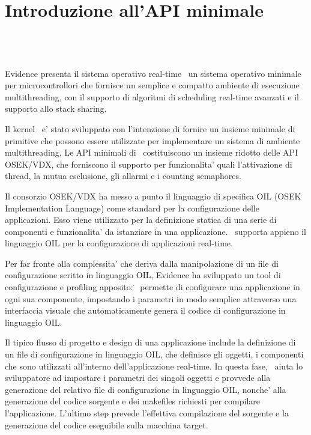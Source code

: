 \chapter{Introduzione all'API minimale}

\section{\ee\ }

Evidence presenta il sistema operativo real-time \ee\, un sistema operativo
minimale per microcontrollori che fornisce un semplice e compatto ambiente
di esecuzione multithreading, con il supporto di algoritmi di scheduling
real-time avanzati e il supporto allo stack sharing.

Il kernel \ee\ e' stato sviluppato con l'intenzione di fornire un insieme
minimale di primitive che possono essere utilizzate per implementare
un sistema di ambiente multithreading. Le API minimali di \ee\ costituiscono un
insieme ridotto delle API OSEK/VDX, che forniscono il supporto per
funzionalita' quali l'attivazione di thread, la mutua esclusione, gli
allarmi e i counting semaphores.

Il consorzio OSEK/VDX ha messo a punto il linguaggio di specifica OIL 
(OSEK Implementation Language) come standard per la configurazione delle
applicazioni. Esso viene utilizzato per la definizione statica di una 
serie di componenti e funzionalita' da istanziare in una applicazione.
\ee\ supporta appieno il linguaggio OIL per la configurazione di 
applicazioni real-time.

Per far fronte alla complessita' che deriva dalla manipolazione di un file 
di configurazione scritto in linguaggio OIL, Evidence ha sviluppato un tool
di configurazione e profiling apposito: \rtd\. \rtd\ permette di 
configurare una applicazione in ogni sua componente, impostando
i parametri in modo semplice attraverso una interfaccia visuale 
che automaticamente genera il codice di configurazione in linguaggio 
OIL.

Il tipico flusso di progetto e design di una applicazione include la definizione
di un file di configurazione in linguaggio OIL, che definisce gli oggetti, i 
componenti che sono utilizzati all'interno dell'applicazione real-time.
In questa fase, \rtd\ aiuta lo sviluppatore ad impostare i parametri dei singoli
oggetti e provvede alla generazione del relativo file di configurazione in
linguaggio OIL, nonche' alla generazione del codice sorgente e dei makefiles
richiesti per compilare l'applicazione. L'ultimo step prevede l'effettiva 
compilazione del sorgente e la generazione del codice eseguibile sulla
macchina target.

